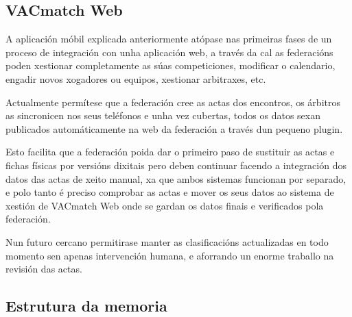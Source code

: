     \subsection{VACmatch Web}
    A aplicación móbil explicada anteriormente atópase nas primeiras fases de 
un proceso de integración con unha aplicación web, a través da cal as 
federacións poden xestionar completamente as súas competiciones, modificar o 
calendario, engadir novos xogadores ou equipos, xestionar arbitraxes, etc.

    Actualmente permítese que a federación cree as actas dos encontros, os 
árbitros as sincronicen nos seus teléfonos e unha vez cubertas, todos os datos 
sexan publicados automáticamente na web da federación a través dun pequeno 
plugin.

    Esto facilita que a federación poida dar o primeiro paso de sustituir as 
actas e fichas físicas por versións dixitais pero deben continuar facendo a 
integración dos datos das actas de xeito manual, xa que ambos sistemas funcionan 
por separado, e polo tanto é preciso comprobar as actas e mover os seus datos 
ao sistema de xestión de VACmatch Web onde se gardan os datos finais e 
verificados pola federación.

    Nun futuro cercano permitirase manter as clasificacións actualizadas en todo 
momento sen apenas intervención humana, e aforrando un enorme traballo na 
revisión das actas.

  \subsection{Estrutura da memoria}
  
  
  
